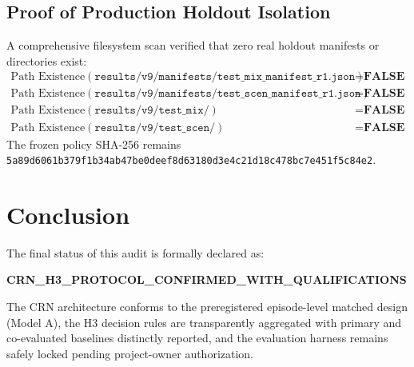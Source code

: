 \documentclass[10pt,a4paper]{article}
\begin{document}
\subsection{Proof of Production Holdout Isolation}
A comprehensive filesystem scan verified that zero real holdout manifests or directories exist:
\begin{equation}
\begin{aligned}
    \text{Path Existence}(\texttt{results/v9/manifests/test\_mix\_manifest\_r1.json}) &= \textbf{FALSE} \\
    \text{Path Existence}(\texttt{results/v9/manifests/test\_scen\_manifest\_r1.json}) &= \textbf{FALSE} \\
    \text{Path Existence}(\texttt{results/v9/test\_mix/}) &= \textbf{FALSE} \\
    \text{Path Existence}(\texttt{results/v9/test\_scen/}) &= \textbf{FALSE}
\end{aligned}
\end{equation}
The frozen policy SHA-256 remains \texttt{5a89d6061b379f1b34ab47be0deef8d63180d3e4c21d18c478bc7e451f5c84e2}.

\section{Conclusion}
The final status of this audit is formally declared as:
\begin{center}
    \textbf{\Large CRN\_H3\_PROTOCOL\_CONFIRMED\_WITH\_QUALIFICATIONS}
\end{center}
The CRN architecture conforms to the preregistered episode-level matched design (Model A), the H3 decision rules are transparently aggregated with primary and co-evaluated baselines distinctly reported, and the evaluation harness remains safely locked pending project-owner authorization.
\end{document}
